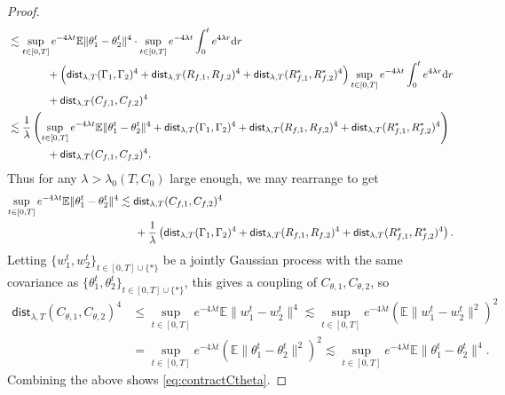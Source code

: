 \documentclass[11pt,letterpaper,reqno]{amsart}
\theoremstyle{definition}
\def\d{\mathrm{d}}
\def\E{\mathbb{E}}
\newcommand{\lbddst}[2]{\mathsf{dist}_{\lambda,T}(#1,#2)}
\newcommand{\norm}[1]{\|#1\|}
\newcommand{\prn}[1]{\left({#1}\right)} %
\begin{document}
\begin{proof}
\begin{align*}
    &\lesssim \sup_{t\in[0,T]}e^{-4\lambda t}\E\norm{\theta_1^t-\theta_2^t}^4\cdot
\sup_{t\in[0,T]}e^{-4\lambda t} \int_0^t e^{4\lambda r}\d r\\
    &\hspace{0.5in}+
\Big(\lbddst{\Gamma_1}{\Gamma_2}^4
+\lbddst{R_{f,1}}{R_{f,2}}^4+\lbddst{R_{f,1}^*}{R_{f,2}^*}^4\Big)
\sup_{t\in[0,T]}e^{-4\lambda t}\int_0^t e^{4\lambda r} \d r\\
&\hspace{0.5in}+ \lbddst{C_{f,1}}{C_{f,2}}^4\\
&\lesssim \frac{1}{\lambda}\left(
\sup_{t\in[0,T]}e^{-4\lambda t}\E\norm{\theta_1^t-\theta_2^t}^4
+\lbddst{\Gamma_1}{\Gamma_2}^4
+\lbddst{R_{f,1}}{R_{f,2}}^4+\lbddst{R_{f,1}^*}{R_{f,2}^*}^4\right)\\
&\hspace{0.5in}+\lbddst{C_{f,1}}{C_{f,2}}^4.
\end{align*}
Thus for any $\lambda>\lambda_0(T,C_0)$ large enough, we may rearrange to get
\begin{align}
\sup_{t\in[0,T]}e^{-4\lambda t}\E\norm{\theta_1^t-\theta_2^t}^4 &\lesssim
\lbddst{C_{f,1}}{C_{f,2}}^4\label{eq:theta4diffbound}\\
&\hspace{0.2in}+\frac{1}{\lambda}\prn{\lbddst{\Gamma_1}{\Gamma_2}^4 +
\lbddst{R_{f,1}}{R_{f,2}}^4 + \lbddst{R_{f,1}^*}{R_{f,2}^*}^4}.\notag
\end{align}
Letting $\{w_1^t,w_2^t\}_{t \in [0,T] \cup \{*\}}$ be a jointly Gaussian process
with the same covariance as $\{\theta_1^t,\theta_2^t\}_{t \in [0,T] \cup
\{*\}}$, this gives a coupling of $C_{\theta,1},C_{\theta,2}$, so
\begin{align*}
\lbddst{C_{\theta,1}}{C_{\theta,2}}^4
&\leq \sup_{t \in [0, T]} e^{-4\lambda t} 
\E {\norm{w^t_1 - w^t_2}^4}
\lesssim \sup_{t \in [0, T]} e^{-4\lambda t} 
(\E {\norm{w^t_1 - w^t_2}^2})^2\\
&= \sup_{t \in [0, T]} e^{-4\lambda t} 
(\E{\norm{\theta^t_1 - \theta^t_2}^2})^2
\lesssim \sup_{t \in [0, T]} e^{-4\lambda t} 
\E{\norm{\theta^t_1 - \theta^t_2}^4}.
\end{align*}
Combining the above shows \eqref{eq:contractCtheta}.


\end{proof}
\end{document}
